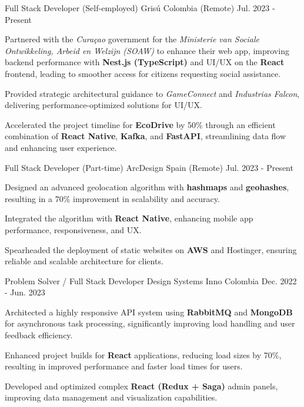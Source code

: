 \begin{cventries}
 \cventry
  {Full Stack Developer (Self-employed)} %
  {Grisú} %
  {Colombia (Remote)} %
  {Jul. 2023 - Present} %
  {
    \begin{cvitems} %
      \item {Partnered with the \textit{Curaçao} government for the \textit{Ministerie van Sociale Ontwikkeling, Arbeid en Welzijn (SOAW)} to enhance their web app, improving backend performance with \textbf{Nest.js (TypeScript)} and UI/UX on the \textbf{React} frontend, leading to smoother access for citizens requesting social assistance.}
      \item {Provided strategic architectural guidance to \textit{GameConnect} and \textit{Industrias Falcon}, delivering performance-optimized solutions for UI/UX.}
      \item {Accelerated the project timeline for \textbf{EcoDrive} by 50\% through an efficient combination of \textbf{React Native}, \textbf{Kafka}, and \textbf{FastAPI}, streamlining data flow and enhancing user experience.}
    \end{cvitems}
  }
  \cventry
  {Full Stack Developer (Part-time)} %
  {ArcDesign} %
  {Spain (Remote)} %
  {Jul. 2023 - Present} %
  {
    \begin{cvitems} %
      \item {Designed an advanced geolocation algorithm with \textbf{hashmaps} and \textbf{geohashes}, resulting in a 70\% improvement in scalability and accuracy.}
      \item {Integrated the algorithm with \textbf{React Native}, enhancing mobile app performance, responsiveness, and UX.}
      \item {Spearheaded the deployment of static websites on \textbf{AWS} and Hostinger, ensuring reliable and scalable architecture for clients.}
    \end{cvitems}
  }

  \cventry
  {Problem Solver / Full Stack Developer} %
  {Design Systems Inno} %
  {Colombia} %
  {Dec. 2022 - Jun. 2023} %
  {
    \begin{cvitems} %
      \item {Architected a highly responsive API system using \textbf{RabbitMQ} and \textbf{MongoDB} for asynchronous task processing, significantly improving load handling and user feedback efficiency.}
      \item {Enhanced project builds for \textbf{React} applications, reducing load sizes by 70\%, resulting in improved performance and faster load times for users.}
      \item {Developed and optimized complex \textbf{React (Redux + Saga)} admin panels, improving data management and visualization capabilities.}
    \end{cvitems}
  }


\end{cventries}
